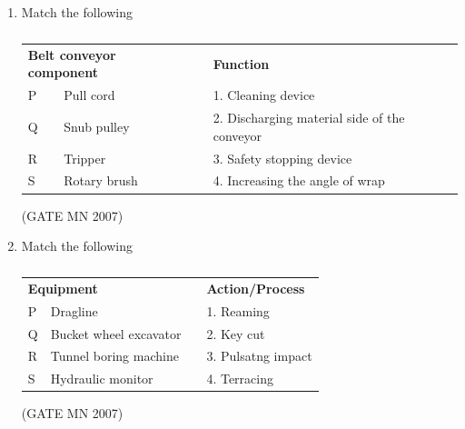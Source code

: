 \documentclass[journal]{IEEEtran}
\begin{document}
\begin{enumerate}
\item Match the following
\begin{table}[H]
    \centering\normalsize
\begin{tabular}{llcl}
\multicolumn{2}{l}{\textbf{Belt conveyor component}} & & \textbf{Function} \\
P & Pull cord      &  & 1. Cleaning device \\
Q & Snub pulley    &  & 2. Discharging material side of the conveyor \\
R & Tripper        &  & 3. Safety stopping device \\
S & Rotary brush   &  & 4. Increasing the angle of wrap \\
\end{tabular}
\caption{}
    \label{tab:Q32}
\end{table}

\hfill (GATE MN 2007)

\begin{enumerate}
\end{enumerate}




\item Match the following
\begin{table}[H]
    \centering\normalsize
\begin{tabular}{llcl}                             
\multicolumn{2}{l}{\textbf{Equipment  }} & & \textbf{Action/Process} \\
P & Dragline       &  & 1. Reaming \\ 
Q & Bucket wheel excavator    &  & 2. Key cut \\                     
R & Tunnel boring machine   &  & 3. Pulsatng impact    \\                                                
S & Hydraulic monitor   &  & 4. Terracing \\                                       
\end{tabular}
\caption{}
    \label{tab:Q33}
\end{table}
\hfill (GATE MN 2007)
\begin{enumerate}
\end{enumerate}




\end{enumerate}
\end{document}

